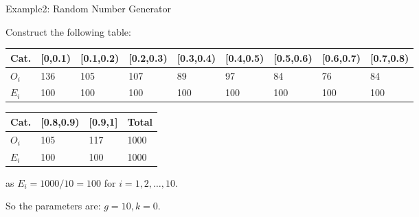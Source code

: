 \documentclass[t,xcolor=pdftex,dvipsnames,table]{beamer}\usepackage[]{graphicx}\usepackage[]{color}
\begin{document}
\begin{frame}[fragile]{Example2: Random Number Generator}

Construct the following table:

\vspace{.5cm}
{\tiny 
\begin{tabular}{l|llllllll}  \hline
Cat. & [0,0.1) &  [0.1,0.2) & [0.2,0.3) & [0.3,0.4) & [0.4,0.5) & [0.5,0.6) & [0.6,0.7) & [0.7,0.8)  \\ \hline
$O_{i}$ & 136 & 105 & 107 & 89 & 97 & 84 & 76 & 84    \\ \hline
$E_{i}$ & 100 & 100 & 100 & 100 & 100 & 100 & 100 & 100    \\ \hline
\end{tabular}
}

\vspace{.5cm}
{\tiny 
\begin{tabular}{l|lll}  \hline
Cat. & [0.8,0.9) &  [0.9,1] & Total \\ \hline
$O_{i}$ & 105  & 117  & 1000      \\ \hline
$E_{i}$ & 100  & 100  & 1000      \\ \hline
\end{tabular}
} 

\vspace{.5cm}
as $E_{i} = 1000/10 = 100$ for $i=1,2,\ldots,10$. 

\vspace{.5cm}
So the parameters are: $g=10, k=0$.
\end{frame} 
\end{document}

